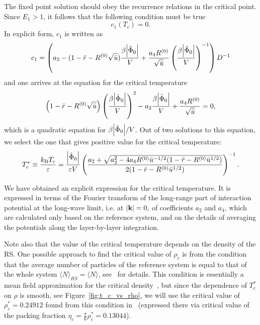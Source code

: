 The fixed point solution should obey the recurrence relations in the critical point. Since $E_1 > 1$, it follows that the following condition must be true
\begin{equation*}
	c_1(T_c) = 0.
\end{equation*}
In explicit form, $c_1$ is written as
\begin{equation*}
	c_1 = 
	\left(
		a_2 - (1 - \bar{r} - R^{(0)}\sqrt{\bar{u}})\frac{\beta \abs{\hat{\Phi}_0}}{V} + \frac{a_4 R^{(0)}}{\sqrt{\bar{u}}} \left(\frac{\beta \abs{\hat{\Phi}_0}}{V}\right)^{-1}
	\right) D^{-1}
\end{equation*}
and one arrives at the equation for the critical temperature
\begin{equation}
	\left(1 - \bar{r} - R^{(0)}\sqrt{\bar{u}} \right) \left(\frac{\beta \abs{\hat{\Phi}_0}}{V}\right)^{2} - a_2  \frac{\beta \abs{\hat{\Phi}_0}}{V} + \frac{a_4 R^{(0)}}{\sqrt{\bar{u}}} = 0,
\end{equation}
which is a quadratic equation for $\beta \abs{\hat{\Phi}_0}/{V}$. Out of two solutions to this equation, we select the one that gives positive value for the critical temperature:
\begin{equation}
	\label{eq:T_c}
	T^*_c \equiv \frac{k_{\rm B} T_c}{\varepsilon} = \frac{\abs{\hat{\Phi}_0}}{\varepsilon V}
	\left(
		\frac
		{a_2 + \sqrt{a_2^2 - 4 a_4 R^{(0)}\bar{u}^{-1/2} (1 - \bar{r} - R^{(0)}\bar{u}^{1/2}) } }
		{2(1 - \bar{r} - R^{(0)}\bar{u}^{1/2})}
	\right)^{-1}.
\end{equation}

We have obtained an explicit expression for the critical temperature. It is expressed in terms of the Fourier transform of the long-range part of interaction potential at the long-wave limit, i.e. at $\abs{\vb k} = 0,$ of coefficients $a_2$ and $a_4$, which are calculated only based on the reference system, and on the details of averaging the potentials along the layer-by-layer integration. 

Note also that the value of the critical temperature depends on the density of the RS. One possible approach to find the critical value of $\rho_c$ is from the condition that the average number of particles of the reference system is equal to that of the whole system $\langle N \rangle_{RS} = \langle N \rangle$, see~\cite{RomaJPS2024} for details. This condition is essentially a mean field approximation for the critical density~\cite{CaillolPatsahan2005,CaillolPatsahan2006}, but since the dependence of $T^*_c$ on $\rho$ is smooth, see Figure~\ref{fig:t_c_vs_rho}, we will use the critical value of $\rho_c^*=0.24912$ found from this condition in~\cite{YukhJSP1995} (expressed there via critical value of the packing fraction $\eta_c = \frac{\pi}{6}\rho^*_c = 0.13044$).

